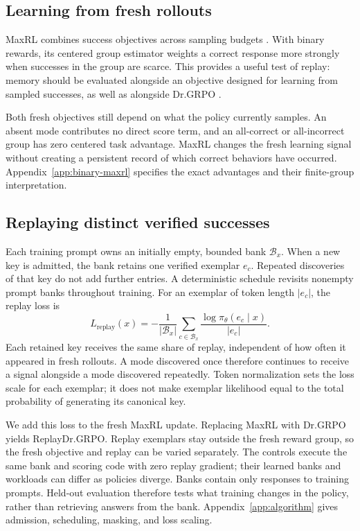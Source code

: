 \documentclass{article}
\newcommand{\1}{\mathbf 1}
\theoremstyle{remark}
\theoremstyle{definition}
\theoremstyle{plain}
\begin{document}
\subsection{Learning from fresh rollouts}
\label{sec:maxrl-method}

MaxRL combines success objectives across sampling budgets
\citep{tajwar2026maxrl}. With binary rewards, its centered group estimator
weights a correct response more strongly when successes in the group are
scarce. This provides a useful test of replay: memory should be evaluated
alongside an objective designed for learning from sampled successes, as well
as alongside Dr.GRPO \citep{liu2025understanding}.

Both fresh objectives still depend on what the policy currently samples.
An absent mode contributes no direct score term, and an all-correct or
all-incorrect group has zero centered task advantage. MaxRL changes the
fresh learning signal without creating a persistent record of which correct
behaviors have occurred. Appendix~\ref{app:binary-maxrl} specifies the exact
advantages and their finite-group interpretation.

\subsection{Replaying distinct verified successes}
\label{sec:replay}

Each training prompt owns an initially empty, bounded bank $\mathcal B_x$.
When a new key is admitted, the bank retains one verified exemplar $e_c$.
Repeated discoveries of that key do not add further entries. A deterministic
schedule revisits nonempty prompt banks throughout training. For an exemplar
of token length $|e_c|$, the replay loss is
\begin{equation}
 L_{\mathrm{replay}}(x)=-\frac{1}{|\mathcal B_x|}
 \sum_{c\in\mathcal B_x}\frac{\log\pi_\theta(e_c\mid x)}{|e_c|}.
 \label{eq:lm-verified-replay}
\end{equation}
Each retained key receives the same share of replay, independent of how often
it appeared in fresh rollouts. A mode discovered once therefore continues to
receive a signal alongside a mode discovered repeatedly. Token normalization
sets the loss scale for each exemplar; it does not make exemplar likelihood
equal to the total probability of generating its canonical key.

We add this loss to the fresh MaxRL update. Replacing MaxRL with Dr.GRPO yields
ReplayDr.GRPO. Replay exemplars stay outside the fresh reward group, so the
fresh objective and replay can be varied separately. The controls execute
the same bank and scoring code with zero replay gradient; their learned banks
and workloads can differ as policies diverge. Banks contain only responses to
training prompts. Held-out evaluation therefore tests what training changes
in the policy, rather than retrieving answers from the bank.
Appendix~\ref{app:algorithm} gives admission, scheduling, masking, and loss scaling.
\end{document}
